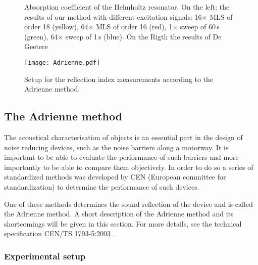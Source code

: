 \begin{figure}[h!]
  \begin{center}
  \hspace{-5cm}
  \hspace{-5cm}
  \caption{Absorption coefficient of the Helmholtz resonator. On the left: the results of our method with different excitation signals: 16$\times$ MLS 	of order 18 (yellow), 64$\times$ MLS of order 16 (red), 1$\times$ sweep of 60\,s (green), 64$\times$ sweep of 1\,s (blue). On the Rigth the results 	of De Geetere\cite[p.84]{Geetere}}\label{alles}
  \end{center}
\end{figure}



\begin{wrapfigure}{R}[0.10\textwidth]{0.34\textwidth}
  \texttt{[image: Adrienne.pdf]}
  \caption{Setup for the reflection index measurements according to the Adrienne method.\label{fig: adrienne}}
\end{wrapfigure}



\subsection{The Adrienne method}
The acoustical characterisation of objects is an essential part in the design of noise reducing devices, such as the noise barriers along a motorway. It is important to be able to evaluate the performance of such barriers and more importantly to be able to compare them objectively. In order to do so a series of standardized methods was developed by CEN (European committee for standardization) to determine the performance of such devices.

One of these methods determines the sound reflection of the device and is called the Adrienne method. A short description of the Adrienne method and its shortcomings will be given in this section. For more details, see the technical specification CEN/TS 1793-5:2003 \cite{Adrienne}.



\subsubsection{Experimental setup}

